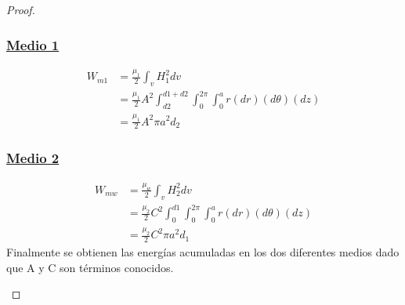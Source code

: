 \begin{proof}
\begin{enumerate}
    \subsubsection*{\underline{Medio 1}}
    \begin{align}
        W_{m1} &= \frac{\mu_{1}}{2}\int_{v} H_{1}^{2} dv\\
               &= \frac{\mu_{1}}{2}A^{2} \int_{d2}^{d1+d2} \int_{0}^{2\pi} \int_{0}^{a} r (dr) (d\theta) (dz)\\
               &=\frac{\mu_{1}}{2} A^{2} \pi a^{2}d_{2} 
    \end{align}
    \subsubsection*{\underline{Medio 2}}
    \begin{align}
        W_{mw} &= \frac{\mu_{w}}{2}\int_{v} H_{2}^{2} dv\\
               &= \frac{\mu_{2}}{2}C^{2} \int_{0}^{d1} \int_{0}^{2\pi} \int_{0}^{a} r (dr) (d\theta) (dz)\\
               &=\frac{\mu_{2}}{2} C^{2} \pi a^{2}d_{1} 
    \end{align}
    Finalmente se obtienen las energías acumuladas en los dos diferentes medios dado que A y C son términos conocidos.
\end{enumerate}

\end{proof}

